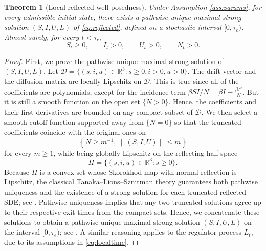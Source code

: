 \documentclass[12pt,a4paper,reqno]{amsart}
\newtheorem{theorem}{Theorem}[section]
\theoremstyle{definition}
\theoremstyle{remark}
\theoremstyle{plain}
\begin{document}
\begin{theorem}[Local reflected well-posedness]\label{thm:wellposed}
Under Assumption \ref{ass:params}, for every admissible initial state, there exists a pathwise-unique maximal strong solution $(S,I,U,L)$ of \eqref{eq:reflected}, defined on a stochastic interval $[0,\tau_e)$. Almost surely, for every $t<\tau_e$,
$$S_t\geq0,\qquad I_t>0,\qquad U_t>0,\qquad N_t>0.$$
\end{theorem}
\begin{proof} First, we prove the pathwise-unique maximal strong solution of $(S,I,U,L)$. Let $\mathcal D = \{(s,i,u)\in\mathbb R^3 : s\geq 0, i>0,u>0\}$. The drift vector and the diffusion matrix are locally Lipschitz on $\mathcal D$. This is true since all of the coefficients are polynomials, except for the incidence term $\beta SI/N=\beta I - \frac{\beta I^2}{N}$. But it is still a smooth function on the open set $\{N>0\}$. Hence, the coefficients and their first derivatives are bounded on any compact subset of $\mathcal D$. We then select a smooth cutoff function supported away from $\{N=0\}$ so that the truncated coefficients coincide with the original ones on
$$
\left\{N\geq m^{-1},\ \|(S,I,U)\|\leq m\right\}
$$
for every $m \ge 1$, while being globally Lipschitz on the reflecting half-space
$$
H = \{(s,i,u)\in\mathbb R^3 : s\ge0\}.
$$
Because $H$ is a convex set whose Skorokhod map with normal reflection is Lipschitz, the classical Tanaka–Lions–Sznitman theory guarantees both pathwise uniqueness and the existence of a strong solution for each truncated reflected SDE; see \cite[Theorem 5.1]{Saisho1987}. Pathwise uniqueness implies that any two truncated solutions agree up to their respective exit times from the compact sets. Hence, we concatenate these solutions to obtain a pathwise unique maximal strong solution $(S,I,U,L)$ on the interval $[0,\tau_e)$; see \cite{Tanaka1979,LionsSznitman1984}. A similar reasoning applies to the regulator process $L_t$, due to its assumptions in \eqref{eq:localtime}.


\end{proof}
\end{document}
